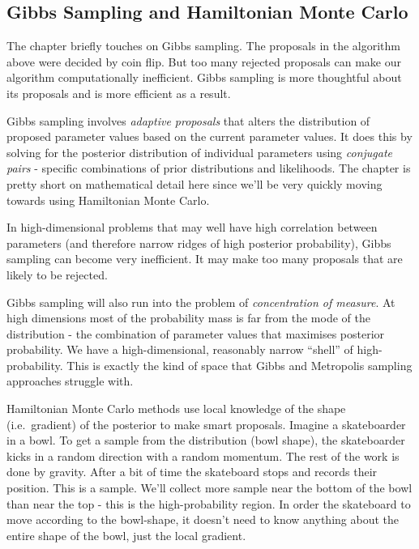 \documentclass[
]{book}
\begin{document}
\hypertarget{gibbs-sampling-and-hamiltonian-monte-carlo}{%
\subsection*{Gibbs Sampling and Hamiltonian Monte Carlo}\label{gibbs-sampling-and-hamiltonian-monte-carlo}}

The chapter briefly touches on Gibbs sampling. The proposals in the algorithm above were decided by coin flip. But too many rejected proposals can make our algorithm computationally inefficient. Gibbs sampling is more thoughtful about its proposals and is more efficient as a result.

Gibbs sampling involves \emph{adaptive proposals} that alters the distribution of proposed parameter values based on the current parameter values. It does this by solving for the posterior distribution of individual parameters using \emph{conjugate pairs} - specific combinations of prior distributions and likelihoods. The chapter is pretty short on mathematical detail here since we'll be very quickly moving towards using Hamiltonian Monte Carlo.

In high-dimensional problems that may well have high correlation between parameters (and therefore narrow ridges of high posterior probability), Gibbs sampling can become very inefficient. It may make too many proposals that are likely to be rejected.

Gibbs sampling will also run into the problem of \emph{concentration of measure}. At high dimensions most of the probability mass is far from the mode of the distribution - the combination of parameter values that maximises posterior probability. We have a high-dimensional, reasonably narrow ``shell'' of high-probability. This is exactly the kind of space that Gibbs and Metropolis sampling approaches struggle with.

Hamiltonian Monte Carlo methods use local knowledge of the shape (i.e.~gradient) of the posterior to make smart proposals. Imagine a skateboarder in a bowl. To get a sample from the distribution (bowl shape), the skateboarder kicks in a random direction with a random momentum. The rest of the work is done by gravity. After a bit of time the skateboard stops and records their position. This is a sample. We'll collect more sample near the bottom of the bowl than near the top - this is the high-probability region. In order the skateboard to move according to the bowl-shape, it doesn't need to know anything about the entire shape of the bowl, just the local gradient.
\end{document}
